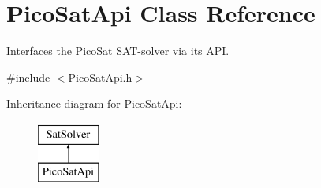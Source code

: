 \hypertarget{classPicoSatApi}{\section{Pico\-Sat\-Api Class Reference}
\label{classPicoSatApi}
}


Interfaces the Pico\-Sat S\-A\-T-\/solver via its A\-P\-I.  




{\ttfamily \#include $<$Pico\-Sat\-Api.\-h$>$}

Inheritance diagram for Pico\-Sat\-Api\-:\begin{figure}[H]
\begin{center}
\leavevmode
\includegraphics[height=2.000000cm]{classPicoSatApi}
\end{center}
\end{figure}
